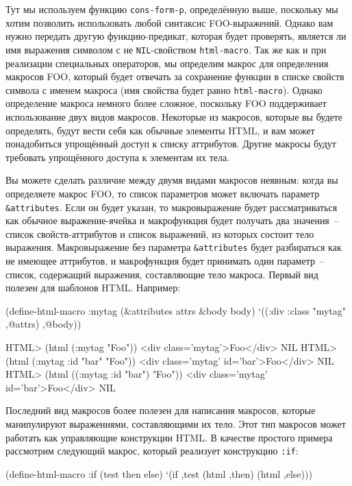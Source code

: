 Тут мы используем функцию \lstinline{cons-form-p}, определённую выше, поскольку мы хотим
позволить использовать любой синтаксис FOO-выражений.  Однако вам нужно передать другую
функцию-предикат, которая будет проверять, является ли имя выражения символом с
не \lstinline{NIL}-свойством \lstinline{html-macro}.  Так же как и при реализации специальных
операторов, мы определим макрос для определения макросов FOO, который будет отвечать за
сохранение функции в списке свойств символа с именем макроса (имя свойства будет равно
\lstinline{html-macro}).  Однако определение макроса немного более сложное, поскольку FOO
поддерживает использование двух видов макросов. Некоторые из макросов, которые вы будете
определять, будут вести себя как обычные элементы HTML, и вам может понадобиться упрощённый
доступ к списку аттрибутов.  Другие макросы будут требовать упрощённого доступа к
элементам их тела.

Вы можете сделать различие между двумя видами макросов неявным: когда вы определяете
макрос FOO, то список параметров может включать параметр \lstinline!&attributes!.  Если он
будет указан, то макровыражение будет рассматриваться как обычное выражение-ячейка и
макрофункция будет получать два значения~-- список свойств-аттрибутов и список выражений,
из которых состоит тело выражения.  Макровыражение без параметра \lstinline!&attributes!
будет разбираться как не имеющее аттрибутов, и макрофункция будет принимать один
параметр~-- список, содержащий выражения, составляющие тело макроса.  Первый вид полезен
для шаблонов HTML. Например:

\begin{myverb}
(define-html-macro :mytag (&attributes attrs &body body)
  `((:div :class "mytag" ,@attrs) ,@body))
\end{myverb}

\begin{myverb}
HTML> (html (:mytag "Foo"))
<div class='mytag'>Foo</div>
NIL
HTML> (html (:mytag :id "bar" "Foo"))
<div class='mytag' id='bar'>Foo</div>
NIL
HTML> (html ((:mytag :id "bar") "Foo"))
<div class='mytag' id='bar'>Foo</div>
NIL
\end{myverb}

Последний вид макросов более полезен для написания макросов, которые манипулируют
выражениями, составляющими их тело.  Этот тип макросов может работать как управляющие
конструкции HTML. В качестве простого примера рассмотрим следующий макрос, который
реализует конструкцию \lstinline{:if}:

\begin{myverb}
(define-html-macro :if (test then else)
  `(if ,test (html ,then) (html ,else)))
\end{myverb}

